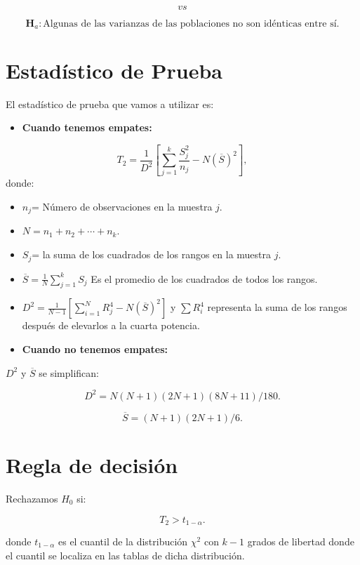 \documentclass[
  a4paper,
  oneside,
  openany]{book}
\providecommand{\tightlist}{%
  \setlength{\itemsep}{0pt}\setlength{\parskip}{0pt}}
\begin{document}
\[vs\]

\[\textbf{H}_a: \mbox{Algunas de las varianzas de las poblaciones no son idénticas entre sí.}\]

\hypertarget{estaduxedstico-de-prueba-8}{%
\section{Estadístico de Prueba}\label{estaduxedstico-de-prueba-8}}

El estadístico de prueba que vamos a utilizar es:

\begin{itemize}
\tightlist
\item
  \textbf{Cuando tenemos empates:}
\end{itemize}

\[T_{2}= \frac{1}{D^2}\left[\sum_{j=1}^{k}\frac{S_{j}^2}{n_j}-N(\overline{S})^2\right],\]
donde:

\begin{itemize}
\item
  \(n_{j}\)= Número de observaciones en la muestra \(j\).
\item
  \(N= n_{1}+n_{2}+\cdots+n_{k}\).
\item
  \(S_{j}\)= la suma de los cuadrados de los rangos en la muestra \(j\).
\item
  \(\overline{S}= \frac{1}{N}\sum_{j=1}^{k}S_{j}\) Es el promedio de los cuadrados de todos los rangos.
\item
  \(D^2=\frac{1}{N-1}\left[\sum_{i=1}^{N}R^4_{j}-N(\overline{S})^2\right]\) y \(\sum{R_{i}^4}\) representa la suma de los rangos después de elevarlos a la cuarta potencia.
\item
  \textbf{Cuando no tenemos empates:}
\end{itemize}

\(D^2\) y \(\overline{S}\) se simplifican:

\[D^2=N(N+1)(2N+1)(8N+11)/180.\]

\[\overline{S}=(N+1)(2N+1)/6.\]

\hypertarget{regla-de-decisiuxf3n-20}{%
\section{Regla de decisión}\label{regla-de-decisiuxf3n-20}}

Rechazamos \(H_0\) si:

\[T_{2}>t_{1-\alpha}.\]

donde \(t_{1-\alpha}\) es el cuantil de la distribución \(\chi^2\) con \(k-1\) grados de libertad donde el cuantil se localiza en las tablas de dicha distribución.
\end{document}
